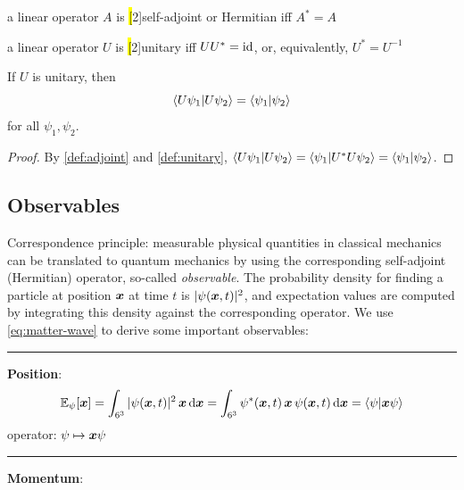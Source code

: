 \begin{definition}%
\label{def:hermitian}
a linear operator $A$ is \hl[2]{self-adjoint} or Hermitian iff $A^* = A$
\end{definition}
\begin{definition}%
\label{def:unitary}
a linear operator $U$ is \hl[2]{unitary} iff $U U^* = \operatorname{id}$, or, equivalently, $U^* = U^{-1}$
\end{definition}

\begin{theorem}\label{thm:unitary-preserves-inner-products}
If \(U\) is unitary, then
\begin{equation}\label{eq:unitary-preserves-inner-products}
\braket{U\psi_1|U\psi_2}
=
\braket{\psi_1|\psi_2}
\end{equation}
for all \(\psi_1,\psi_2\).
\end{theorem}

\begin{proof}
By \autoref{def:adjoint} and \autoref{def:unitary}, 
\(
\braket{U\psi_1|U\psi_2}
=
\braket{\psi_1|U^*U\psi_2}
=
\braket{\psi_1|\psi_2}
\).
\end{proof}






\subsection{Observables}

Correspondence principle: measurable physical quantities in classical mechanics can be translated to quantum mechanics by using the corresponding self-adjoint (Hermitian) operator, so-called \emph{observable}.
The probability density for finding a particle at position ${\boldsymbol{x}}$ at time $t$ is $|\psi({\boldsymbol{x}},t)|^2$, and expectation values are computed by integrating this density against the corresponding operator.
We use \eqref{eq:matter-wave} to derive some important observables:

\medskip
\hrule
\textbf{Position}:
\[
\operatorname{\mathbb{E}}_\psi[{\boldsymbol{x}}]
=
\int_{6^3} |\psi({\boldsymbol{x}}, t)|^2 \, {\boldsymbol{x}} \,\mathrm{d}{\boldsymbol{x}}
=
\int_{6^3} \psi^*({\boldsymbol{x}}, t) \, {\boldsymbol{x}} \, \psi({\boldsymbol{x}}, t) \,\mathrm{d}{\boldsymbol{x}} 
=
\braket{\psi | {\boldsymbol{x}}  \psi}
\]
operator: 
$
\psi \mapsto {\boldsymbol{x}}  \psi
$
\medskip
\hrule
\textbf{Momentum}:

